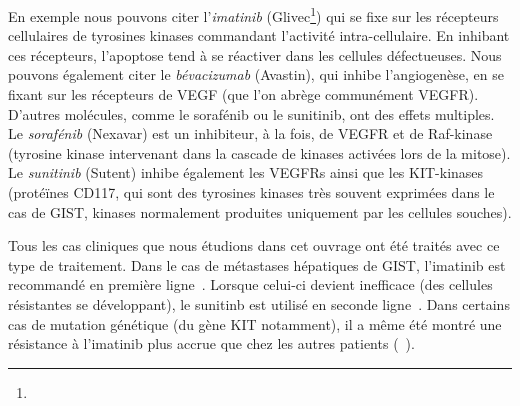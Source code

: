 \documentclass[main.tex]{subfiles}
\begin{document}
En exemple nous pouvons citer l'\emph{imatinib} (Glivec\footnote{}) qui se fixe sur les récepteurs cellulaires de tyrosines kinases %
commandant l'activité intra-cellulaire. En inhibant ces récepteurs, l'apoptose tend à se réactiver dans les cellules défectueuses. 
Nous pouvons également citer le \emph{bévacizumab} (Avastin), qui inhibe l'angiogenèse, en se fixant sur les récepteurs de VEGF (que l'on abrège communément VEGFR). D'autres molécules, comme  le sorafénib ou le sunitinib, ont des effets multiples. 
Le \emph{sorafénib} (Nexavar) est un inhibiteur, à la fois, de VEGFR et de Raf-kinase (tyrosine kinase intervenant dans la cascade de kinases activées lors de la mitose). 
Le \emph{sunitinib} (Sutent) inhibe également les VEGFRs ainsi que les KIT-kinases (protéïnes CD117, qui sont des tyrosines kinases très souvent exprimées dans le cas de GIST, kinases normalement produites uniquement par les cellules souches).


Tous les cas cliniques que nous étudions dans cet ouvrage ont été traités avec ce type de traitement. Dans le cas de métastases hépatiques de GIST, l'imatinib est recommandé en première ligne~\cite{demetri2002efficacy}. 
Lorsque celui-ci devient inefficace %
(des cellules résistantes se développant), le sunitinb est utilisé en seconde ligne~\cite{Demetri20061329,saltz2007phase,houk2010relationship}. 
Dans certains cas de mutation génétique (du gène KIT notamment), il a même été montré une résistance à l'imatinib plus accrue que chez les autres patients  (\cf~\cite{rubin2001kit,lux2000kit,lasota2000mutations}).
\end{document}
